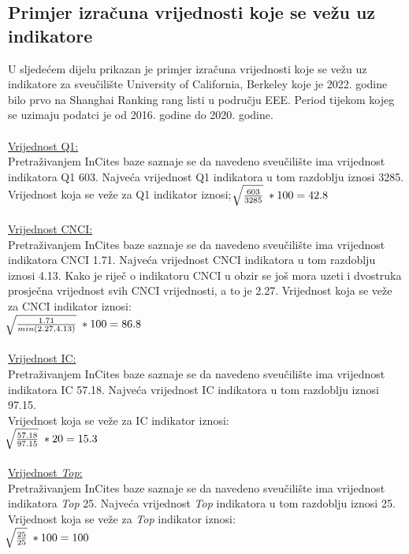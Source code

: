 \documentclass[times, utf8, zavrsni]{fer}
\begin{document}
\subsection{Primjer izračuna vrijednosti koje se vežu uz indikatore}
\label{racunanje}
U sljedećem dijelu prikazan je primjer izračuna vrijednosti koje se vežu uz indikatore za sveučilište University of California, Berkeley koje je 2022. godine bilo prvo na 
Shanghai Ranking rang listi u području EEE.
Period tijekom kojeg se uzimaju podatci je od 2016. godine do 2020. godine.
\\
\\ \underline{Vrijednost Q1:} 
\\ Pretraživanjem InCites baze saznaje se da navedeno sveučilište ima vrijednost indikatora Q1 603. Najveća vrijednost Q1 indikatora u tom razdoblju iznosi 3285.
Vrijednost koja se veže za Q1 indikator iznosi;  \; $\sqrt[\leftroot{-2}]{\frac{603}{3285}} \; * 100 = 42.8$
\\
\\ \underline{Vrijednost CNCI:} 
\\ Pretraživanjem InCites baze saznaje se da navedeno sveučilište ima vrijednost indikatora CNCI 1.71. Najveća vrijednost CNCI indikatora u tom razdoblju iznosi 4.13.
Kako je riječ o indikatoru CNCI u obzir se još mora uzeti i dvostruka prosječna vrijednost svih CNCI vrijednosti, a to je 2.27.
Vrijednost koja se veže za CNCI indikator iznosi: \; \\ $\sqrt[\leftroot{-2}]{\frac{1.71}{min(2.27, 4.13)}} \; * 100 = 86.8$
\\
\\ \underline{Vrijednost IC:} 
\\ Pretraživanjem InCites baze saznaje se da navedeno sveučilište ima vrijednost indikatora IC 57.18. Najveća vrijednost IC indikatora u tom razdoblju iznosi 97.15.
\\Vrijednost koja se veže za IC indikator iznosi: \; \\ $\sqrt[\leftroot{-2}]{\frac{57.18}{97.15}} \; * 20 = 15.3$
\\
\\ \underline{Vrijednost \emph{Top}:} 
\\ Pretraživanjem InCites baze saznaje se da navedeno sveučilište ima vrijednost indikatora \emph{Top} 25. Najveća vrijednost \emph{Top} indikatora u tom razdoblju iznosi 25.
Vrijednost koja se veže za \emph{Top} indikator iznosi: \; \\ $\sqrt[\leftroot{-2}]{\frac{25}{25}} \; * 100 = 100$
\\
\end{document}
